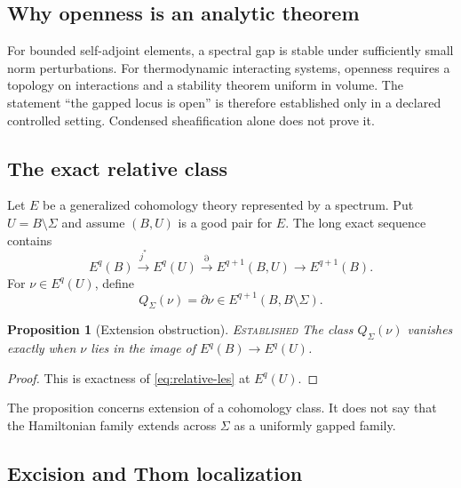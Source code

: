 \documentclass[12pt]{article}
\newtheorem{proposition}[theorem]{Proposition}
\theoremstyle{definition}
\theoremstyle{remark}
\newcommand{\EST}{\textnormal{\textsc{Established}}}
\begin{document}
\subsection{Why openness is an analytic theorem}

For bounded self-adjoint elements, a spectral gap is stable under sufficiently
small norm perturbations.  For thermodynamic interacting systems, openness
requires a topology on interactions and a stability theorem uniform in
volume.  The statement ``the gapped locus is open'' is therefore established
only in a declared controlled setting.  Condensed sheafification alone does
not prove it.

\subsection{The exact relative class}

Let $E$ be a generalized cohomology theory represented by a spectrum.  Put
$U=B\setminus\Sigma$ and assume $(B,U)$ is a good pair for $E$.  The long
exact sequence contains
\begin{equation}
E^q(B)\xrightarrow{j^*}E^q(U)
\xrightarrow{\partial}E^{q+1}(B,U)
\longrightarrow E^{q+1}(B).
\label{eq:relative-les}
\end{equation}
For $\nu\in E^q(U)$, define
\begin{equation}
Q_\Sigma(\nu)=\partial\nu
\in E^{q+1}(B,B\setminus\Sigma).
\label{eq:relative-charge}
\end{equation}

\begin{proposition}[Extension obstruction]
\label{prop:extension-obstruction}
\EST{}  The class $Q_\Sigma(\nu)$ vanishes exactly when $\nu$ lies in the
image of $E^q(B)\to E^q(U)$.
\end{proposition}

\begin{proof}
This is exactness of \cref{eq:relative-les} at $E^q(U)$.
\end{proof}

The proposition concerns extension of a cohomology class.  It does not say
that the Hamiltonian family extends across $\Sigma$ as a uniformly gapped
family.

\subsection{Excision and Thom localization}
\end{document}
